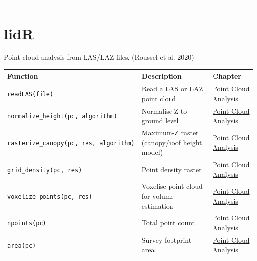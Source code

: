 \documentclass[
  11pt,
  letterpaper,
  DIV=11,
  numbers=noendperiod]{scrreprt}
\begin{document}
\begin{center}\rule{0.5\linewidth}{0.5pt}\end{center}

\section{lidR}\label{lidr}

Point cloud analysis from LAS/LAZ files. (Roussel et al. 2020)

\begin{longtable}[]{@{}
  >{\raggedright\arraybackslash}p{}
  >{\raggedright\arraybackslash}p{}
  >{\raggedright\arraybackslash}p{}@{}}
\toprule\noalign{}
\begin{minipage}[b]{\linewidth}\raggedright
Function
\end{minipage} & \begin{minipage}[b]{\linewidth}\raggedright
Description
\end{minipage} & \begin{minipage}[b]{\linewidth}\raggedright
Chapter
\end{minipage} \\
\midrule\noalign{}
\endhead
\bottomrule\noalign{}
\endlastfoot
\texttt{readLAS(file)} & Read a LAS or LAZ point cloud &
\hyperref[point-cloud-analysis]{Point Cloud Analysis} \\
\texttt{normalize\_height(pc,\ algorithm)} & Normalise Z to ground level
& \hyperref[point-cloud-analysis]{Point Cloud Analysis} \\
\texttt{rasterize\_canopy(pc,\ res,\ algorithm)} & Maximum-Z raster
(canopy/roof height model) & \hyperref[point-cloud-analysis]{Point Cloud
Analysis} \\
\texttt{grid\_density(pc,\ res)} & Point density raster &
\hyperref[point-cloud-analysis]{Point Cloud Analysis} \\
\texttt{voxelize\_points(pc,\ res)} & Voxelise point cloud for volume
estimation & \hyperref[point-cloud-analysis]{Point Cloud Analysis} \\
\texttt{npoints(pc)} & Total point count &
\hyperref[point-cloud-analysis]{Point Cloud Analysis} \\
\texttt{area(pc)} & Survey footprint area &
\hyperref[point-cloud-analysis]{Point Cloud Analysis} \\
\end{longtable}
\end{document}
